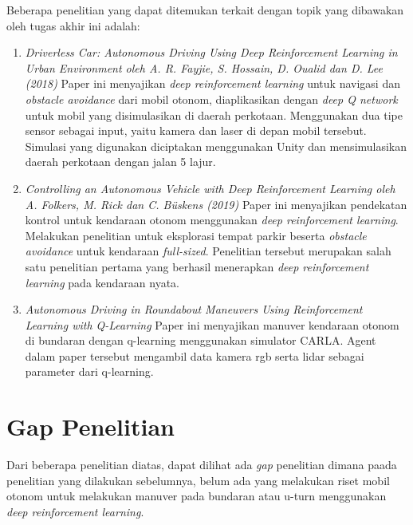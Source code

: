 Beberapa penelitian yang dapat ditemukan terkait dengan topik yang dibawakan oleh tugas akhir ini adalah:
\begin{enumerate}
	\item \textit{Driverless Car: Autonomous Driving Using Deep Reinforcement Learning in Urban Environment oleh A. R. Fayjie, S. Hossain, D. Oualid dan D. Lee (2018)}\newline
	Paper ini menyajikan \textit{deep reinforcement learning }untuk navigasi dan \textit{obstacle avoidance }dari mobil otonom, diaplikasikan dengan \textit{deep Q network }untuk mobil yang disimulasikan di daerah perkotaan. Menggunakan dua tipe sensor sebagai input, yaitu kamera dan laser di depan mobil tersebut. Simulasi yang digunakan diciptakan menggunakan Unity dan mensimulasikan daerah perkotaan dengan jalan 5 lajur.\cite{cit:1}
	
	\item \textit{Controlling an Autonomous Vehicle with Deep Reinforcement Learning oleh A. Folkers, M. Rick dan C. Büskens (2019)}\newline
	Paper ini menyajikan pendekatan kontrol untuk kendaraan otonom menggunakan \textit{deep reinforcement learning}. Melakukan penelitian untuk eksplorasi tempat parkir beserta \textit{obstacle avoidance }untuk kendaraan \textit{full-sized}. Penelitian tersebut merupakan salah satu penelitian pertama yang berhasil menerapkan \textit{deep reinforcement learning }pada kendaraan nyata.\cite{cit:2}
	
	\item \textit{Autonomous Driving in Roundabout Maneuvers Using Reinforcement Learning with Q-Learning}\newline
	Paper ini menyajikan manuver kendaraan otonom di bundaran dengan q-learning menggunakan simulator CARLA.\cite{cit:autonomdrive_roundabout_qlearning} Agent dalam paper tersebut mengambil data kamera rgb serta lidar sebagai parameter dari q-learning.
	
\end{enumerate}

\section{Gap Penelitian}
\label{sec:gap_penelitian}

Dari beberapa penelitian diatas, dapat dilihat ada \textit{gap} penelitian dimana paada penelitian yang dilakukan sebelumnya, belum ada yang melakukan riset mobil otonom untuk melakukan manuver pada bundaran atau u-turn menggunakan \textit{deep reinforcement learning}.
